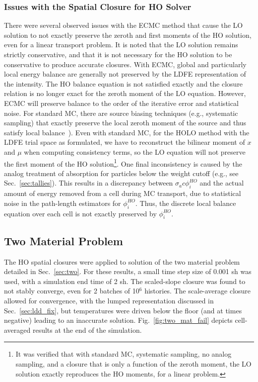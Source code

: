 \subsubsection{Issues with the Spatial Closure for HO Solver}
\label{sec:ecmc_issues}
There were several observed issues with the ECMC method that cause the LO solution to not exactly preserve
the zeroth and first moments of the HO solution, even for a linear transport problem.  
It is noted that the LO solution remains strictly conservative, and that it is not necessary for the HO solution to be conservative
to produce accurate closures.  
With ECMC, global and particularly local
energy balance are generally not preserved by the LDFE representation of the intensity. 
The HO balance equation is not satisfied exactly and the closure relation is no
longer exact for the zeroth moment of the LO equation.  
However, ECMC will preserve balance to the order of
the iterative error and statistical noise.  
For standard MC, there
are source biasing techniques (e.g., systematic
sampling) that exactly preserve the local zeroth moment of the
source and thus satisfy local balance~\cite{shultis_mc,wollaber_review}).
Even with standard MC, for the HOLO method with the LDFE trial space as formulated, we have to reconstruct the bilinear moment
of $x$ and $\mu$ when computing consistency terms, so the LO equation will not
preserve the first moment of the HO solution\footnote{It was verified that with
standard MC, systematic sampling, no analog sampling, and a closure that is only a
function of the zeroth moment, the LO solution exactly reproduces the HO moments, for
a linear problem.}.  One final inconsistency is caused by the analog treatment of absorption for
particles below the weight cutoff (e.g., see Sec.~\ref{sec:tallies}).  This results in a
discrepancy between $\sigma_a c \phi^{HO}_i$ and the actual amount of energy removed from a cell during MC
transport, due to statistical noise in the path-length
estimators for $\phi^{HO}_i$.   Thus, the discrete local balance equation over each cell is not exactly
preserved by $\phi^{HO}_i$.  



\subsection{Two Material Problem}

The HO spatial closures were applied to solution of the two material problem detailed in Sec.~\ref{sec:two}.
For these results, a small time step size of 0.001 sh was used, with a simulation end time
of 2 sh.  The scaled-slope closure was found to not stably converge, even for 2 batches of 10$^6$
histories.  The scale-average closure allowed for convergence, with the lumped
representation discussed in Sec.~\ref{sec:ldd_fix},
but temperatures were driven
below the floor (and at times negative) leading to an inaccurate solution. Fig.~\ref{fig:two_mat_fail} depicts cell-averaged results at the end of the simulation.

